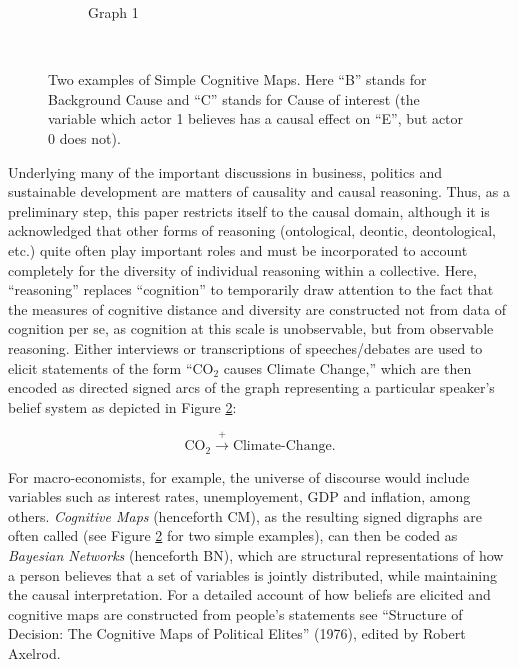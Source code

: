 \documentclass[11pt]{article}
\begin{document}
\begin{figure}
\begin{subfigure}[b]{0.3\textwidth}
                \caption{Graph 1}
                \label{fig:tiger}
        \end{subfigure}
        ~ %
        \caption{Two examples of Simple Cognitive Maps. Here ``B'' stands for Background Cause and ``C'' stands for Cause of interest (the variable which actor 1 believes has a causal effect on ``E'', but actor 0 does not).}\label{fig:animals}
\end{figure}
Underlying many of the important discussions in business, politics and sustainable development are matters of causality and causal reasoning. Thus, as a preliminary step, this paper restricts itself to the causal domain, although it is acknowledged that other forms of reasoning (ontological, deontic, deontological, etc.) quite often play important roles and must be incorporated to account completely for the diversity of individual reasoning within a collective. Here, ``reasoning'' replaces ``cognition'' to temporarily draw attention to the fact that the measures of cognitive distance and diversity are constructed not from data of cognition per se, as cognition at this scale is unobservable, but from observable reasoning. Either interviews or transcriptions of speeches/debates are used to elicit statements of the form ``CO$_2$ causes Climate Change,'' which are then encoded as directed signed arcs of the graph representing a particular speaker's belief system as depicted in Figure \ref{fig:animals}:

$$\mbox{CO}_2 \xrightarrow{+} \mbox{Climate-Change.}$$

For macro-economists, for example, the universe of discourse would include variables such as interest rates, unemployement, GDP and inflation, among others. \emph{Cognitive Maps} (henceforth CM), as the resulting signed digraphs are often called (see Figure \ref{fig:animals} for two simple examples), can then be coded as \emph{Bayesian Networks} (henceforth BN), which are structural representations of how a person believes that a set of variables is jointly distributed, while maintaining the causal interpretation.
For a detailed account of how beliefs are elicited and cognitive maps are constructed from people's statements see ``Structure of Decision: The Cognitive Maps of Political Elites'' (1976), edited by Robert Axelrod.
\end{document}
